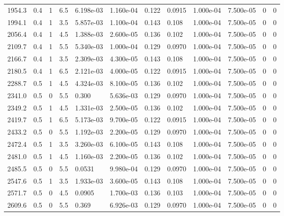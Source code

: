 \documentclass[preview]{standalone}
\begin{document}
{{{\begin{tabular}{L{1.2cm}C{1.2cm} C{0.3cm}C{0.5cm} C{1.4cm}C{1.4cm} C{1.4cm}C{1.4cm} C{1.6cm}C{1.6cm} C{1.6cm}C{1.6cm}}
  1954.3  &   0.4  & 1     & 6.5 &  6.198e-03  & 1.160e-04  &  0.122&   0.0915& 1.000e-04 & 7.500e-05   &  0 & 0  \\ 
  1994.1  &   0.4  & 1     & 3.5 &  5.857e-03  & 1.100e-04  &  0.143&   0.108& 1.000e-04 & 7.500e-05   &  0 & 0  \\ 
  2056.4  &   0.4  & 1     & 4.5 &  1.388e-03  & 2.600e-05  &  0.136&   0.102& 1.000e-04 & 7.500e-05   &  0 & 0  \\ 
  2109.7  &   0.4  & 1     & 5.5 &  5.340e-03  & 1.000e-04  &  0.129&   0.0970& 1.000e-04 & 7.500e-05   &  0 & 0  \\ 
  2166.7  &   0.4  & 1     & 3.5 &  2.309e-03  & 4.300e-05  &  0.143&   0.108& 1.000e-04 & 7.500e-05   &  0 & 0  \\ 
  2180.5  &   0.4  & 1     & 6.5 &  2.121e-03  & 4.000e-05  &  0.122&   0.0915& 1.000e-04 & 7.500e-05   &  0 & 0  \\ 
  2288.7  &   0.5  & 1     & 4.5 &  4.324e-03  & 8.100e-05  &  0.136&   0.102& 1.000e-04 & 7.500e-05   &  0 & 0  \\ 
  2341.0  &   0.5  & 0     & 5.5 &  0.300  & 5.636e-03  &  0.129&   0.0970& 1.000e-04 & 7.500e-05   &  0 & 0  \\ 
  2349.2  &   0.5  & 1     & 4.5 &  1.331e-03  & 2.500e-05  &  0.136&   0.102& 1.000e-04 & 7.500e-05   &  0 & 0  \\ 
  2419.7  &   0.5  & 1     & 6.5 &  5.173e-03  & 9.700e-05  &  0.122&   0.0915& 1.000e-04 & 7.500e-05   &  0 & 0  \\ 
  2433.2  &   0.5  & 0     & 5.5 &  1.192e-03  & 2.200e-05  &  0.129&   0.0970& 1.000e-04 & 7.500e-05   &  0 & 0  \\ 
  2472.4  &   0.5  & 1     & 3.5 &  3.260e-03  & 6.100e-05  &  0.143&   0.108& 1.000e-04 & 7.500e-05   &  0 & 0  \\ 
  2481.0  &   0.5  & 1     & 4.5 &  1.160e-03  & 2.200e-05  &  0.136&   0.102& 1.000e-04 & 7.500e-05   &  0 & 0  \\ 
  2485.5  &   0.5  & 0     & 5.5 &  0.0531  & 9.980e-04  &  0.129&   0.0970& 1.000e-04 & 7.500e-05   &  0 & 0  \\ 
  2547.6  &   0.5  & 1     & 3.5 &  1.933e-03  & 3.600e-05  &  0.143&   0.108& 1.000e-04 & 7.500e-05   &  0 & 0  \\ 
  2571.7  &   0.5  & 0     & 4.5 &  0.0905  & 1.700e-03  &  0.136&   0.103& 1.000e-04 & 7.500e-05   &  0 & 0  \\ 
  2609.6  &   0.5  & 0     & 5.5 &  0.369  & 6.926e-03  &  0.129&   0.0970& 1.000e-04 & 7.500e-05   &  0 & 0  \\ 

\end{tabular}}}}
\end{document}
